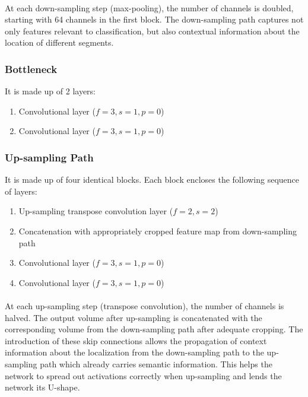 \documentclass[12pt, a4paper]{report}
\begin{document}
\paragraph{}
At each down-sampling step (max-pooling), the number of channels is doubled, starting with 64 channels in the first block. The down-sampling path captures not only features relevant to classification, but also contextual information about the location of different segments.
\subsubsection{Bottleneck}
It is made up of 2 layers:
\begin{enumerate}
	\item Convolutional layer ($f=3, s=1, p=0$)
	\item Convolutional layer ($f=3, s=1, p=0$)
\end{enumerate}
\subsubsection{Up-sampling Path}
It is made up of four identical blocks. Each block encloses the following sequence of layers:
\begin{enumerate}
	\item Up-sampling transpose convolution layer ($f=2, s=2$)
	\item Concatenation with appropriately cropped feature map from down-sampling path
	\item Convolutional layer ($f=3, s=1, p=0$)
	\item Convolutional layer ($f=3, s=1, p=0$)
\end{enumerate}
\paragraph{}
At each up-sampling step (transpose convolution), the number of channels is halved. The output volume after up-sampling is concatenated with the corresponding volume from the down-sampling path after adequate cropping. The introduction of these skip connections allows the propagation of context information about the localization from the down-sampling path to the up-sampling path which already carries semantic information. This helps the network to spread out activations correctly when up-sampling and lends the network its U-shape.
\end{document}
